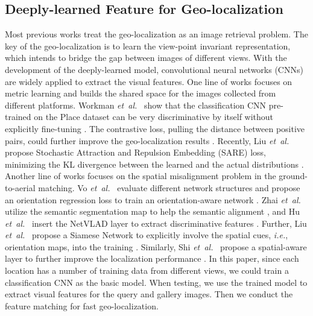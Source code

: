 \documentclass[sigconf]{acmart}
\def\ie{\emph{i.e.}}
\def\etal{\emph{et~al.}}
\begin{document}
\subsection{Deeply-learned Feature for Geo-localization}
Most previous works treat the geo-localization as an image retrieval problem. The key of the geo-localization is to learn the view-point invariant representation, which intends to bridge the gap between images of different views. With the development of the deeply-learned model, convolutional neural networks (CNNs) are widely applied to extract the visual features. 
One line of works focuses on metric learning and builds the shared space for the images collected from different platforms. Workman \etal~ show that the classification CNN pre-trained on the Place dataset \cite{zhou2017places} can be very discriminative by itself without explicitly fine-tuning \cite{workman2015location}. The contrastive loss, pulling the distance between positive pairs, could further improve the geo-localization results \cite{workman2015wide,lin2015learning}. Recently, Liu \etal~ propose Stochastic Attraction and Repulsion
Embedding (SARE) loss, minimizing the KL divergence between the learned and the actual distributions \cite{liu2019stochastic}.
Another line of works focuses on the spatial misalignment problem in the ground-to-aerial matching. Vo \etal~ evaluate different network structures and propose an orientation regression loss to train an orientation-aware network \cite{vo2016localizing}. Zhai \etal~ utilize the semantic segmentation map to help the semantic alignment \cite{zhai2017predicting}, and Hu \etal~ insert the NetVLAD layer \cite{arandjelovic2016netvlad} to extract discriminative features \cite{hu2018cvm}. Further, Liu \etal~ propose a Siamese Network to explicitly involve the spatial cues, \ie, orientation maps, into the training \cite{liu2019lending}. Similarly, Shi \etal~ propose a spatial-aware layer to further improve the localization performance \cite{shi2019optimal}. In this paper, since each location has a number of training data from different views, we could train a classification CNN as the basic model. When testing, we use the trained model to extract visual features for the query and gallery images. Then we conduct the feature matching for fast geo-localization.
\end{document}
